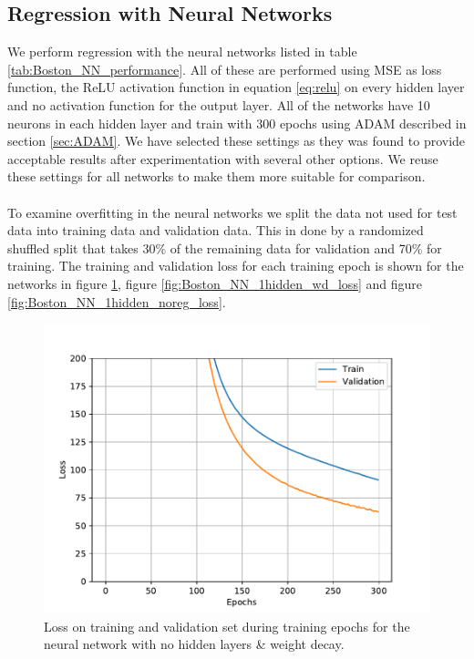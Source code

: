 \subsection{Regression with Neural Networks}
We perform regression with the neural networks listed in table \ref{tab:Boston_NN_performance}. All of these are performed using MSE as loss function, the ReLU activation function in equation \ref{eq:relu} on every hidden layer and no activation function for the output layer. All of the networks have 10 neurons in each hidden layer and train with 300 epochs using ADAM described in section \ref{sec:ADAM}. We have selected these settings as they was found to provide acceptable results after experimentation with several other options. We reuse these settings for all networks to make them more suitable for comparison. 
\\
\\
To examine overfitting in the neural networks we split the data not used for test data into training data and validation data. This in done by a randomized shuffled split that takes 30\% of the remaining data for validation and 70\% for training. The training and validation loss for each training epoch is shown for the networks in figure \ref{fig:Boston_NN_nohidden_wd_loss}, figure \ref{fig:Boston_NN_1hidden_wd_loss} and figure \ref{fig:Boston_NN_1hidden_noreg_loss}.\\

\begin{figure}
    \centering
    \includegraphics{pics/figure_Boston_NN_nohidden_wd_loss.pdf}
    \caption{Loss on training and validation set during training epochs for the neural network with no hidden layers \& weight decay.}
    \label{fig:Boston_NN_nohidden_wd_loss}
\end{figure}

